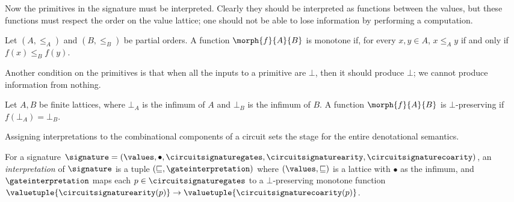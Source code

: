 Now the primitives in the signature must be interpreted.
Clearly they should be interpreted as functions between the values, but these
functions must respect the order on the value lattice; one should not be able to
lose information by performing a computation.

\begin{definition}
    Let \((A, \leq_A)\) and \((B, \leq_B)\) be partial orders.
    A function \(\morph{f}{A}{B}\) is monotone if, for every \(x, y \in A\),
    \(x \leq_A y\) if and only if \(f(x) \leq_B f(y)\).
\end{definition}

Another condition on the primitives is that when all the inputs to a primitive
are \(\bot\), then it should produce \(\bot\); we cannot produce information
from nothing.

\begin{definition}
    Let \(A,B\) be finite lattices, where \(\bot_A\) is the infimum of \(A\) and
    \(\bot_B\) is the infimum of \(B\).
    A function \(\morph{f}{A}{B}\) is \(\bot\)-preserving if
    \(f(\bot_A) = \bot_B\).
\end{definition}

Assigning interpretations to the combinational components of a circuit sets the
stage for the entire denotational semantics.

\begin{definition}[Interpretation]
    For a signature \(
    \signature = (
    \values, \bullet, \circuitsignaturegates, \circuitsignaturearity,
    \circuitsignaturecoarity
    )\), an \emph{interpretation} of
    \(\signature\) is a tuple \((\sqsubseteq, \gateinterpretation)\) where
    \((\values, \sqsubseteq)\) is a lattice with \(\bullet\) as the
    infimum, and \(\gateinterpretation\) maps each
    \(p \in \circuitsignaturegates\) to a \(\bot\)-preserving monotone function
    \(
    \valuetuple{\circuitsignaturearity(p)}
    \to
    \valuetuple{\circuitsignaturecoarity(p)}
    \).
\end{definition}

